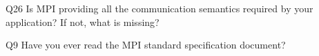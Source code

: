\begin{description}%
\item{Q26} Is MPI providing all the communication semantics required by your application? If not, what is missing?%
\item{Q9} Have you ever read the MPI standard specification document?%
\end{description}%
